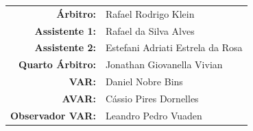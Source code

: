 \documentclass[11pt]{article}
\begin{document}
\vspace{0.5cm}
\begin{minipage}{0.65\textwidth}
\begin{center}
\begin{tabular}{rl}
\textbf{Árbitro:} & Rafael Rodrigo Klein \\
\textbf{Assistente 1:} & Rafael da Silva Alves \\
\textbf{Assistente 2:} & Estefani Adriati Estrela da Rosa \\
\textbf{Quarto Árbitro:} & Jonathan Giovanella Vivian \\
\textbf{VAR:} & Daniel Nobre Bins \\
\textbf{AVAR:} & Cássio Pires Dornelles \\
\textbf{Observador VAR:} & Leandro Pedro Vuaden \\
\end{tabular}
\end{center}
\end{minipage}
\begin{minipage}{0.3\textwidth}
\end{minipage}
\newpage
\end{document}

